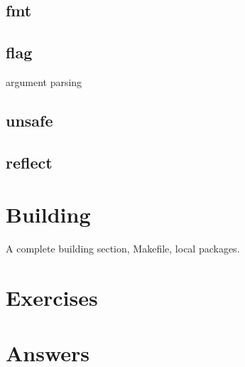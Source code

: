 \subsection{fmt}

\subsection{flag}
argument parsing

\subsection{unsafe}

\subsection{reflect}

\section{Building}
A complete building section, Makefile, local packages.

\section{Exercises}


\cleardoublepage
\section{Answers}
\shipoutAnswer
